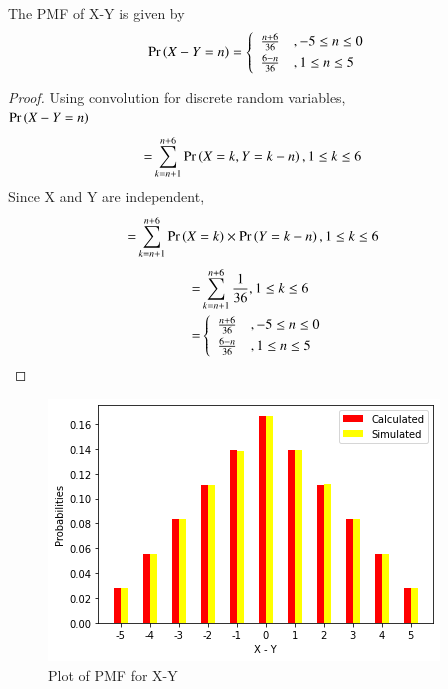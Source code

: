 \begin{lemma}
The PMF of X-Y is given by\\
\begin{align}
    \Pr\brak{X-Y=n}
    =
    \left\{
	        \begin{array}{ll}
		    \frac{n+6}{36} & , -5 \leq n \leq 0 \smallskip\\
		    \frac{6-n}{36} & , 1  \leq n \leq 5
	        \end{array}
    \right.
\end{align}
\end{lemma}
\begin{proof}
Using convolution for discrete random variables,\\
$\Pr\left(X-Y=n\right)$
\begin{align}
    =&\sum_{k=n+1}^{n+6} \Pr\left(X=k,Y=k-n\right), 1\leq k \leq 6
\end{align}
Since X and Y are independent,
\begin{align}
    =&\sum_{k=n+1}^{n+6} \Pr\left(X=k\right)\times\Pr\left(Y=k-n\right), 1\leq k \leq 6
\end{align}
\begin{align}
    =&\sum_{k=n+1}^{n+6} \frac{1}{36}, 1\leq k \leq 6\\
    =&
    \left\{
	        \begin{array}{ll}
		    \frac{n+6}{36} & , -5 \leq n \leq 0 \smallskip\\
		    \frac{6-n}{36} & , 1  \leq n \leq 5
	        \end{array}
    \right.\label{var/4/0.0.12}
\end{align}
\end{proof}
\begin{figure}[htb]
    \includegraphics[width=\columnwidth]{variable/solutions/4/Figures/Assignment-4(2).png}
    \caption{Plot of PMF for X-Y}
\end{figure}
